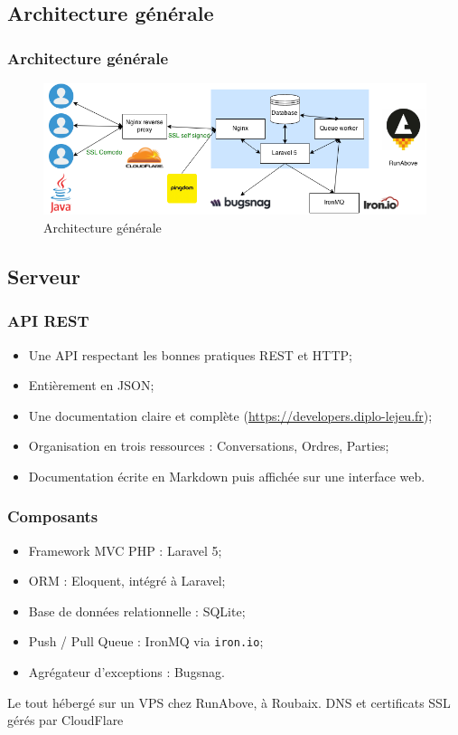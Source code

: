 \subsection{Architecture générale}
	\begin{frame}
		\frametitle{Architecture générale}
		\begin{figure}
			\centering
			\includegraphics[width=1\textwidth]{images/architecture.png}
			\caption{Architecture générale}
			\label{fig:architecture-generale}
		\end{figure}
	\end{frame}

\subsection{Serveur}
	\begin{frame}
		\frametitle{API REST}
		\begin{itemize}
			\item Une API respectant les bonnes pratiques REST et HTTP;
			\item Entièrement en JSON;
			\item Une documentation claire et complète (\url{https://developers.diplo-lejeu.fr});
			\item Organisation en trois ressources : Conversations, Ordres, Parties;
			\item Documentation écrite en Markdown puis affichée sur une interface web.
		\end{itemize}
	\end{frame}

	\begin{frame}
		\frametitle{Composants}
		\begin{itemize}
			\item Framework MVC PHP : Laravel 5;
			\item ORM : Eloquent, intégré à Laravel;
			\item Base de données relationnelle : SQLite;
			\item Push / Pull Queue : IronMQ via \texttt{iron.io};
			\item Agrégateur d'exceptions : Bugsnag.
		\end{itemize}\bigskip
		Le tout hébergé sur un VPS chez RunAbove, à Roubaix. DNS et certificats SSL gérés par CloudFlare
	\end{frame}

